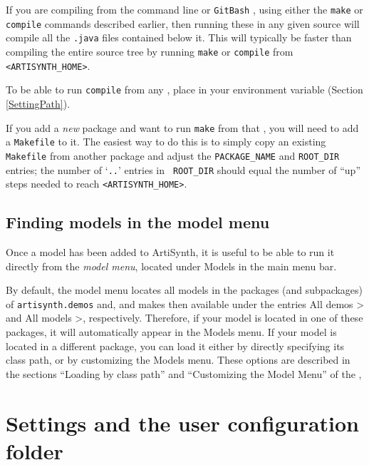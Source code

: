 If you are compiling from the command line 
\ifWindows
or {\tt GitBash}%
\fi
, using either the {\tt make} or {\tt compile} commands described
earlier, then running these in any given source \directory{}
will compile all the {\tt .java} files contained below it. This will
typically be faster than compiling the entire source tree by running
{\tt make} or {\tt compile} from {\tt <ARTISYNTH\_HOME>}.

\begin{sideblock}
To be able to run {\tt compile} from any \directory{},
place  in your \PATH{} environment variable
(Section \ref{SettingPath}).
\end{sideblock}

\begin{sideblock}
If you add a {\it new} package \directory{} and want to run {\tt make}
from that \directory{}, you will need to add a {\tt Makefile} to
it. The easiest way to do this is to simply copy an existing {\tt
Makefile} from another package and adjust the {\tt PACKAGE\_NAME} and
{\tt ROOT\_DIR} entries; the number of `{\tt ..}'  entries in {\tt
ROOT\_DIR} should equal the number of ``up'' steps needed to reach
{\tt <ARTISYNTH\_HOME>}.
\end{sideblock}

\subsection{Finding models in the model menu}

Once a model has been added to ArtiSynth, it is useful to be able to
run it directly from the {\it model menu}, located under {\sf Models}
in the main menu bar.

By default, the model menu locates all models in the packages
(and subpackages) of {\tt artisynth.demos} and, and makes then available under the entries {\sf All
demos >} and {\sf All models >}, respectively. Therefore, if your
model is located in one of these packages, it will automatically
appear in the {\sf Models} menu. If your model is located in a
different package, you can load it either by directly specifying its
class path, or by customizing the {\sf Models} menu.  These options
are described in the sections ``Loading by class path'' and
``Customizing the Model Menu'' of the
,

\section{Settings and the user configuration folder}
\label{UserConfigFolder:sec}

